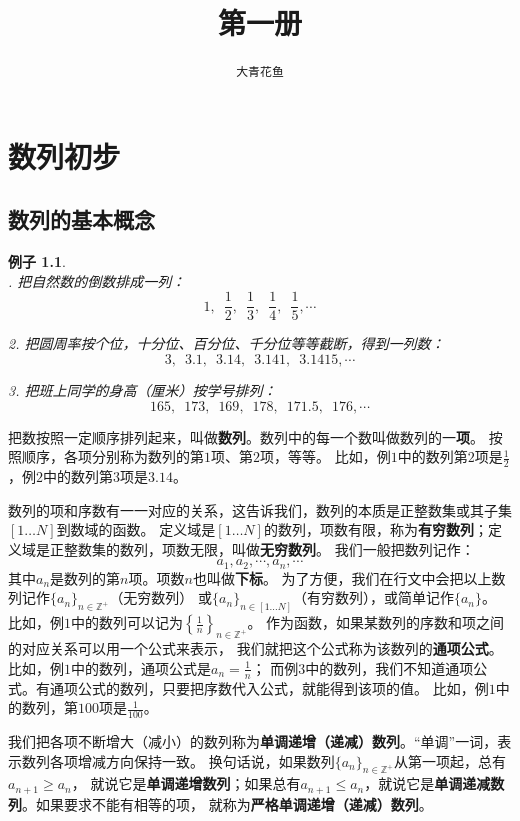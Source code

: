 \documentclass[12pt,UTF8]{ctexbook}
\title{\zihao{0} \bfseries 第一册}
\author{\zihao{2} \texttt{大青花鱼}}
\date{}
\newtheorem{ex}{例子}[section]
\begin{document}
\maketitle
\tableofcontents
\newpage

\chapter{数列初步}

\section{数列的基本概念}

\begin{ex}
    \mbox{}\\
    . 把自然数的倒数排成一列：
$$ 1,\,\,\, \frac{1}{2}, \,\,\, \frac{1}{3}, \,\,\,\frac{1}{4}, \,\,\,\frac{1}{5}, \cdots $$

2. 把圆周率按个位，十分位、百分位、千分位等等截断，得到一列数：
$$  3,\,\,\, 3.1,\,\,\, 3.14,\,\,\, 3.141,\,\,\, 3.1415, \cdots   $$

    3. 把班上同学的身高（厘米）按学号排列：
$$ 165,\,\,\, 173,\,\,\, 169,\,\,\, 178, \,\,\,171.5,\,\,\, 176, \cdots  $$
\end{ex}
把数按照一定顺序排列起来，叫做\textbf{数列}。数列中的每一个数叫做数列的一\textbf{项}。
按照顺序，各项分别称为数列的第$1$项、第$2$项，等等。
比如，例$1$中的数列第$2$项是$\frac{1}{2}$，例$2$中的数列第$3$项是$3.14$。

数列的项和序数有一一对应的关系，这告诉我们，数列的本质是正整数集或其子集$[1\ldots N]$到数域的函数。
定义域是$[1\ldots N]$的数列，项数有限，称为\textbf{有穷数列}；定义域是正整数集的数列，项数无限，叫做\textbf{无穷数列}。
我们一般把数列记作：
$$ a_1, a_2, \cdots, a_n, \cdots $$
其中$a_n$是数列的第$n$项。项数$n$也叫做\textbf{下标}。
为了方便，我们在行文中会把以上数列记作$\{a_n\}_{n\in\mathbb{Z}^+}$（无穷数列）
或$\{a_n\}_{n\in[1\ldots N]}$（有穷数列），或简单记作$\{a_n\}$。
比如，例$1$中的数列可以记为$\left\{\frac{1}{n}\right\}_{n\in\mathbb{Z}^+}$。
作为函数，如果某数列的序数和项之间的对应关系可以用一个公式来表示，
我们就把这个公式称为该数列的\textbf{通项公式}。比如，例$1$中的数列，通项公式是$a_n = \frac{1}{n}$；
而例$3$中的数列，我们不知道通项公式。有通项公式的数列，只要把序数代入公式，就能得到该项的值。
比如，例$1$中的数列，第$100$项是$\frac{1}{100}$。

我们把各项不断增大（减小）的数列称为\textbf{单调递增（递减）数列}。“单调”一词，表示数列各项增减方向保持一致。
换句话说，如果数列$\{a_n\}_{n\in\mathbb{Z}^+}$从第一项起，总有$a_{n+1} \geqslant a_n$，
就说它是\textbf{单调递增数列}；如果总有$a_{n+1} \leqslant a_n$，就说它是\textbf{单调递减数列}。如果要求不能有相等的项，
就称为\textbf{严格单调递增（递减）数列}。
\end{document}
